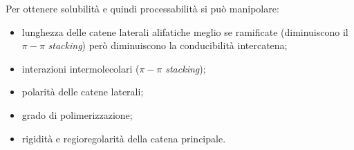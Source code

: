 Per ottenere solubilità e quindi processabilità si può manipolare:
\begin{itemize}
    \item lunghezza delle catene laterali alifatiche meglio se ramificate (diminuiscono il $\pi-\pi$ \emph{stacking}) però diminuiscono la conducibilità intercatena;
        \item interazioni intermolecolari ($\pi-\pi$ \emph{stacking});
\item polarità delle catene laterali;
\item grado di polimerizzazione;
    \item rigidità e regioregolarità della catena principale.
  \end{itemize}

